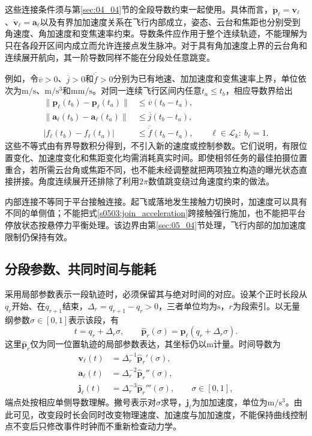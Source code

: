 这些连接条件须与第\ref{sec:04_04}节的全段导数约束一起使用。具体而言，$\dot{\mathbf p}_\ell=\mathbf v_\ell$、$\dot{\mathbf v}_\ell=\mathbf a_\ell$以及有界加加速度关系在飞行内部成立，姿态、云台和焦距也分别受到角速度、角加速度和变焦速率约束。导数条件应作用于整个连续轨迹，不能理解为只在各段开区间内成立而允许连接点发生脉冲。对于具有角加速度上界的云台角和连续展开航向，其一阶导数同样不能在分段处任意跳变。

例如，令$\overline v>0$、$\overline j>0$和$\overline{\dot f}>0$分别为已有地速、加加速度和变焦速率上界，单位依次为$\mathrm{m/s}$、$\mathrm{m/s^3}$和$\mathrm{mm/s}$。对同一连续飞行区间内任意$t_a\le t_b$，相应导数界给出
\begin{align}
 \|\mathbf p_\ell(t_b)-\mathbf p_\ell(t_a)\|
 &\le\overline v(t_b-t_a),
 \label{s0503:position_time_bound}\\
 \|\mathbf a_\ell(t_b)-\mathbf a_\ell(t_a)\|
 &\le\overline j(t_b-t_a),
 \label{s0503:acceleration_time_bound}\\
 |f_\ell(t_b)-f_\ell(t_a)|
 &\le\overline{\dot f}(t_b-t_a),
 \qquad\ell\in\mathcal L_k:\ b_\ell=1.
 \label{s0503:focal_time_bound}
\end{align}
这些不等式由有界导数积分得到，不引入新的速度或控制参数。它们说明，有限位置变化、加速度变化和焦距变化均需消耗真实时间。即使相邻任务的最佳拍摄位置重合，若所需云台角或焦距不同，也不能未经调整就把两项独立构造的曝光状态直接拼接。角度连续展开还排除了利用$2\pi$数值跳变绕过角速度约束的做法。

内部连接不等同于平台接触连接。起飞或落地发生接触力切换时，加速度可以具有不同的单侧值；不能把式\eqref{s0503:join_acceleration}跨接触强行施加，也不能把平台停放状态按悬停力平衡处理。该边界由第\ref{sec:05_04}节处理，飞行内部的加加速度限制仍保持有效。

\subsection{分段参数、共同时间与能耗}

采用局部参数表示一段轨迹时，必须保留其与绝对时间的对应。设某个正时长段从$q_r$开始、在$q_{r+1}$结束，$\Delta_r=q_{r+1}-q_r>0$，三者单位均为$\mathrm{s}$，$r$为段索引。以无量纲参数$\sigma\in[0,1]$表示该段，有
\begin{equation}
 t=q_r+\Delta_r\sigma,
 \qquad
 \widehat{\mathbf p}_r(\sigma)
 =\mathbf p_\ell(q_r+\Delta_r\sigma).
 \label{s0503:segment_clock}
\end{equation}
这里$\widehat{\mathbf p}_r$仅为同一位置轨迹的局部参数表达，其坐标仍以$\mathrm m$计量。时间导数为
\begin{align}
 \mathbf v_\ell(t)
 &=\Delta_r^{-1}\widehat{\mathbf p}_r'(\sigma),
 \label{s0503:segment_velocity}\\
 \mathbf a_\ell(t)
 &=\Delta_r^{-2}\widehat{\mathbf p}_r''(\sigma),
 \label{s0503:segment_acceleration}\\
 \mathbf j_\ell(t)
 &=\Delta_r^{-3}\widehat{\mathbf p}_r'''(\sigma),
 \qquad \sigma\in[0,1],
 \label{s0503:segment_jerk}
\end{align}
端点处按相应单侧导数理解。撇号表示对$\sigma$求导，$\mathbf j_\ell$为加加速度，单位为$\mathrm{m/s^3}$。由此可见，改变段时长会同时改变物理速度、加速度与加加速度，不能保持曲线控制点不变后只修改事件时钟而不重新检查动力学。

